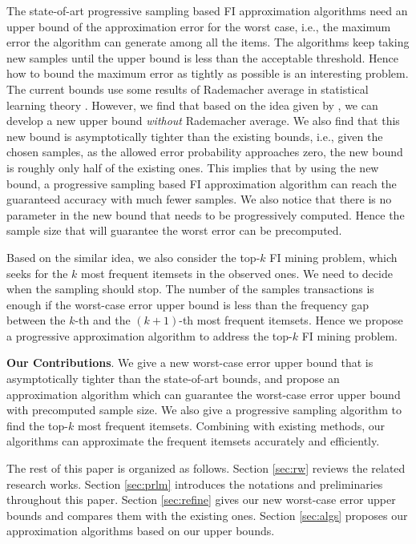 \documentclass{article}
\begin{document}
The state-of-art progressive sampling based FI approximation algorithms \cite{RU15} need an upper bound of the approximation error for the worst case, i.e., the maximum error the algorithm can generate among all the items. The algorithms keep taking new samples until the upper bound is less than the acceptable threshold. Hence how to bound the maximum error as tightly as possible is an interesting problem. The current bounds use some results of Rademacher average in statistical learning theory \cite{Vap98,Vap13,BBL04,BBL05}. 
However, we find that based on the idea given by \cite{BBL04}, we can develop a new upper bound \emph{without} Rademacher average. 
We also find that this new bound is asymptotically tighter than the existing bounds, i.e., given the chosen samples, as the allowed error probability approaches zero, the new bound is roughly only half of the existing ones. This implies that by using the new bound, a progressive sampling based FI approximation algorithm can reach the guaranteed accuracy with much fewer samples. We also notice that there is no parameter in the new bound that needs to be progressively computed. Hence the sample size that will guarantee the worst error can be precomputed.

Based on the similar idea, we also consider the top-$k$ FI mining problem, which seeks for the $k$ most frequent itemsets in the observed ones. We need to decide when the sampling should stop. The number of the samples transactions is enough if the worst-case error upper bound is less than the frequency gap between the $k$-th and the $(k+1)$-th most frequent itemsets. Hence we propose a progressive approximation algorithm to address the top-$k$ FI mining problem.

{\bf Our Contributions}. We give a new worst-case error upper bound that is asymptotically tighter than the state-of-art bounds, and propose an approximation algorithm which can guarantee the worst-case error upper bound with precomputed sample size. We also give a progressive sampling algorithm to find the top-$k$ most frequent itemsets. Combining with existing methods, our algorithms can approximate the frequent itemsets accurately and efficiently.

The rest of this paper is organized as follows. Section \ref{sec:rw} reviews the related research works. Section \ref{sec:prlm} introduces the notations and preliminaries throughout this paper. Section \ref{sec:refine} gives our new worst-case error upper bounds and compares them with the existing ones. Section \ref{sec:algs} proposes our approximation algorithms based on our upper bounds.
\end{document}
